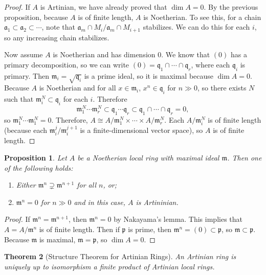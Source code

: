 \documentclass[leqno, openany]{memoir}
\newtheorem{thm}{Theorem}[section]
\newtheorem{prop}[thm]{Proposition}
\theoremstyle{definition}
\theoremstyle{remark}
\theoremstyle{plain}
\theoremstyle{definition}
\theoremstyle{remark}
\newcommand{\mf}[1]{\mathfrak{#1}}
\begin{document}
\begin{proof}
    If $A$ is Artinian, we have already proved that $\dim A = 0$. By the previous proposition, because $A$ is of finite length, $A$ is Noetherian. To see this, for a chain $\mf{a}_1 \subset \mf{a}_2 \subset \cdots$, note that $\mf{a}_m \cap M_i / \mf{a}_m \cap M_{i+1}$ stabilizes. We can do this for each $i$, so any increasing chain stabilizes.

    Now assume $A$ is Noetherian and has dimension $0$. We know that $(0)$ has a primary decomposition, so we can write $(0) = \mf{q}_1 \cap \cdots \cap \mf{q}_r$, where each $\mf{q}_i$ is primary. Then $\mf{m}_i = \sqrt{\mf{q}_i}$ is a prime ideal, so it is maximal because $\dim A = 0$. Because $A$ is Noetherian and for all $x \in \mf{m}_i$, $x^n \in \mf{q}_i$ for $n \gg 0$, so there exists $N$ such that $\mf{m}_i^N \subset \mf{q}_i$ for each $i$. Therefore 
    \[ \mf{m}_1^N \cdots \mf{m}_r^N \subset \mf{q}_1 \cdots \mf{q}_r \subset \mf{q}_1 \cap \cdots \cap \mf{q}_r = 0, \]
    so $\mf{m}_1^N \cdots \mf{m}_1^N = 0$. Therefore, $A \cong A / \mf{m}_1^N \times \cdots \times A / \mf{m}_r^N$. Each $A / \mf{m}_i^N$ is of finite length (because each $\mf{m}_i^j / \mf{m}_i^{j+1}$ is a finite-dimensional vector space), so $A$ is of finite length.
\end{proof}

\begin{prop}
    Let $A$ be a Noetherian local ring with maximal ideal $\mf{m}$. Then one of the following holds:
    \begin{enumerate}[label=(\alph*)]
        \item Either $\mf{m}^n \supsetneq \mf{m}^{n+1}$ for all $n$, or;
        \item $\mf{m}^n = 0$ for $n \gg 0$ and in this case, $A$ is Artininian.
    \end{enumerate}
\end{prop}

\begin{proof}
    If $\mf{m}^n = \mf{m}^{n+1}$, then $\mf{m}^n = 0$ by Nakayama's lemma. This implies that $A = A / \mf{m}^n$ is of finite length. Then if $\mf{p}$ is prime, then $\mf{m}^n = (0) \subset \mf{p}$, so $\mf{m} \subset \mf{p}$. Because $\mf{m}$ is maximal, $\mf{m} = \mf{p}$, so $\dim A = 0$.
\end{proof}

\begin{thm}[Structure Theorem for Artinian Rings]
    An Artinian ring is uniquely up to isomorphism a finite product of Artinian local rings.
\end{thm}
\end{document}
